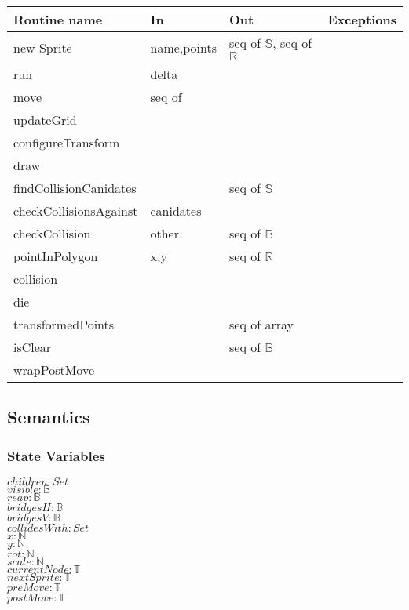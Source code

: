\documentclass[12pt]{article}
\begin{document}
\begin{tabular}{| l | l | l | p{5cm} |}
\hline
\textbf{Routine name} & \textbf{In} & \textbf{Out} & \textbf{Exceptions}\\
\hline
new Sprite & name,points  & seq of $\mathbb{S}$, seq of $\mathbb{R}$ & ~\\
\hline
run & delta & ~ & ~\\
\hline
move & seq of ~ & ~ & ~\\
\hline
updateGrid & ~ & ~ & ~\\
\hline
configureTransform & ~ & ~ & ~\\
\hline
draw & ~ & ~ & ~ \\
\hline
findCollisionCanidates & ~ & seq of $\mathbb{S}$ & ~\\
\hline
checkCollisionsAgainst & canidates & ~ & ~\\
\hline
checkCollision & other & seq of $\mathbb{B}$ & ~\\
\hline
pointInPolygon & x,y & seq of $\mathbb{R}$ & ~ \\
\hline
collision & ~ & ~ & ~ \\
\hline
die & ~ & ~ & ~ \\
\hline
transformedPoints & ~ & seq of array & ~ \\
\hline
isClear & ~ & seq of $\mathbb{B}$ & ~ \\
\hline
wrapPostMove & ~ & ~ & ~ \\
\hline


\end{tabular}
\subsection* {Semantics}

\subsubsection* {State Variables}

$children: Set$\\
$visible: \mathbb{B}$\\
$reap: \mathbb{B}$\\
$bridgesH: \mathbb{B}$\\
$bridgesV: \mathbb{B}$\\
$collidesWith: Set$\\
$x: \mathbb{N}$\\
$y: \mathbb{N}$\\
$rot: \mathbb{N}$\\
$scale: \mathbb{N}$\\
$currentNode: \mathbb{T}$\\
$nextSprite: \mathbb{T}$\\
$preMove: \mathbb{T}$\\
$postMove: \mathbb{T}$\\
\end{document}

